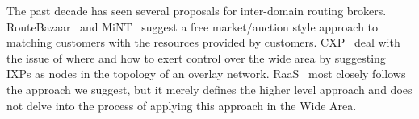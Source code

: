 The past decade has seen several proposals for inter-domain routing brokers. RouteBazaar~\cite{esquivel2009routebazaar} and MiNT~\cite{valancius2008mint} suggest a free market/auction style approach to matching customers with the resources provided by customers. CXP~\cite{hong2013achieving} deal with the issue of where and how to exert control over the wide area by suggesting IXPs as nodes in the topology of an overlay network. RaaS~\cite{lakshminarayanan2004routing} most closely follows the approach we suggest, but it merely defines the higher level approach and does not delve into the process of applying this approach in the Wide Area.
